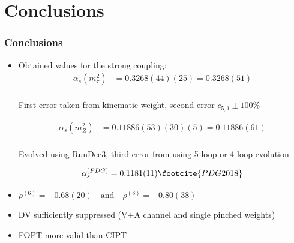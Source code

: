 \documentclass{beamer}
\begin{document}


\section{Conclusions}
\begin{frame}
  \frametitle{Conclusions}
  \begin{itemize}
  \item Obtained values for the strong coupling:
    \begin{equation*}
      \begin{split}
        \alpha_s(m_\tau^2) &= 0.3268(44)(25) = 0.3268(51) \\
      \end{split}
    \end{equation*}
    \begin{small}First error taken from kinematic weight, second error \(c_{5,1} \pm 100\%\)\end{small}
    \begin{equation*}
      \begin{split}
        \alpha_s(m_Z^2) &= 0.11886(53)(30)(5) = 0.11886(61) \\
      \end{split}
    \end{equation*}
    \begin{small}Evolved using RunDec3, third error from using 5-loop or 4-loop evolution\end{small}
    \begin{equation*}
      \alpha_s^{(PDG)} = 0.1181(11)\footcite{PDG2018}
    \end{equation*}
  \item \(\rho^{(6)} = -0.68(20) \quad \text{and} \quad \rho^{(8)} = -0.80(38)\)
  \item DV sufficiently suppressed (V+A channel and single pinched weights)
  \item FOPT more valid than CIPT
  \end{itemize}
\end{frame}
\end{document}
